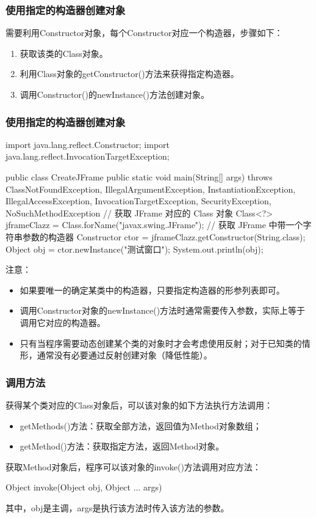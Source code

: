 \begin{frame}[fragile] %
\frametitle{使用指定的构造器创建对象}

需要利用Constructor对象，每个Constructor对应一个构造器，步骤如下：
\begin{enumerate}
\item 获取该类的Class对象。
\item 利用Class对象的getConstructor()方法来获得指定构造器。
\item 调用Constructor()的newInstance()方法创建对象。
\end{enumerate}
\end{frame}

\begin{frame}[fragile] %
\frametitle{使用指定的构造器创建对象}

\begin{javaCode}
import java.lang.reflect.Constructor;
import java.lang.reflect.InvocationTargetException;

public class CreateJFrame {
  public static void main(String[] args) throws ClassNotFoundException,
  IllegalArgumentException, InstantiationException,
  IllegalAccessException, InvocationTargetException,
  SecurityException, NoSuchMethodException {
    // 获取 JFrame 对应的 Class 对象
    Class<?> jframeClazz = Class.forName("javax.swing.JFrame");
    // 获取 JFrame 中带一个字符串参数的构造器
    Constructor ctor = jframeClazz.getConstructor(String.class);
    Object obj = ctor.newInstance("测试窗口");
    System.out.println(obj);
  }
}  
\end{javaCode}
注意：
\begin{itemize}\scriptsize
\item 如果要唯一的确定某类中的构造器，只要指定构造器的{\Red 形参列表}即可。
\item 调用Constructor对象的newInstance()方法时通常需要传入参数，实际上等于调用它对应的构造器。
\item 只有当程序需要动态创建某个类的对象时才会考虑使用反射；对于已知类的情形，通常没有必要通过反射创建对象（降低性能）。
\end{itemize}
\end{frame}

\begin{frame}[fragile] %
\frametitle{调用方法}

获得某个类对应的Class对象后，可以该对象的如下方法执行方法调用：
\begin{itemize}
\item getMethods()方法：获取全部方法，返回值为Method对象数组；
\item getMethod()方法：获取指定方法，返回Method对象。
\end{itemize}
获取Method对象后，程序可以该对象的invoke()方法调用对应方法：
\begin{javaCode}
Object invoke(Object obj, Object ... args)
\end{javaCode}
其中，obj是主调，args是执行该方法时传入该方法的参数。
\end{frame}

